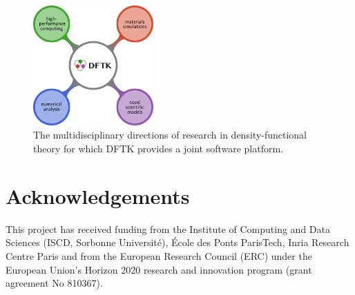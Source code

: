 \documentclass{juliacon}
\begin{document}
\begin{figure}[t]
    \centerline{\includegraphics[width=4.6cm]{dftk.pdf}}
    \caption{The multidisciplinary
        directions of research in density-functional theory
        for which DFTK provides a joint software platform.}
    \label{fig:logodftk}
\end{figure}

\section*{Acknowledgements}
This project has received funding from the Institute of
Computing and Data Sciences (ISCD, Sorbonne Université), École des Ponts
ParisTech, Inria Research Centre Paris and from the European Research Council
(ERC) under the European Union's Horizon 2020 research and innovation program
(grant agreement No 810367).




\end{document}
